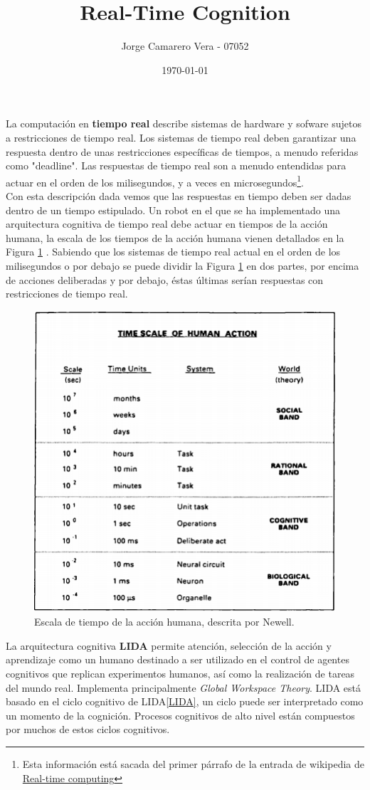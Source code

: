 \documentclass[a4paper, fontsize=11pt]{scrartcl} %
\title{	
	\normalfont \normalsize 
	\huge Real-Time Cognition \\ %
}
\author{Jorge Camarero Vera - 07052} %
\date{\normalsize\today} %
\numberwithin{equation}{section} %
\numberwithin{figure}{section} %
\numberwithin{table}{section} %
\begin{document}
	\maketitle
	
	La computación en \textbf{tiempo real} describe sistemas de hardware y sofware sujetos a restricciones de tiempo real. Los sistemas de tiempo real deben garantizar una respuesta dentro de unas restricciones específicas de tiempos, a menudo referidas como "deadline". Las respuestas de tiempo real son a menudo entendidas para actuar en el orden de los milisegundos, y a veces en microsegundos\footnote{Esta información está sacada del primer párrafo de la entrada de wikipedia de \href{https://en.wikipedia.org/wiki/Real-time_computing}{Real-time computing}}.\\
	
	Con esta descripción dada vemos que las respuestas en tiempo deben ser dadas dentro de un tiempo estipulado. Un robot en el que se ha implementado una arquitectura cognitiva de tiempo real debe actuar en tiempos de la acción humana, la escala de los tiempos de la acción humana vienen detallados en la Figura \ref{Times} . Sabiendo que los sistemas de tiempo real actual en el orden de los milisegundos o por debajo se puede dividir la Figura \ref{Times} en dos partes, por encima de acciones deliberadas y por debajo, éstas últimas serían respuestas con restricciones de tiempo real.\\
	
	\begin{figure}[h!]
		\centering
		\includegraphics[width=0.5\linewidth]{images/Time.png}
		\caption{Escala de tiempo de la acción humana, descrita por Newell\cite{TIMES}.}
		\label{Times}
	\end{figure}
	\FloatBarrier
	
	La arquitectura cognitiva \textbf{LIDA}\cite{LIDA} permite atención, selección de la acción y aprendizaje como un humano destinado a ser utilizado en el control de agentes cognitivos que replican experimentos humanos, así como la realización de tareas del mundo real. Implementa principalmente \textit{Global Workspace Theory}\cite{GWT}. LIDA está basado en el ciclo cognitivo de LIDA\ref{LIDA}, un ciclo puede ser interpretado como un momento de la cognición. Procesos cognitivos de alto nivel están compuestos por muchos de estos ciclos cognitivos.\\
	
\end{document}
